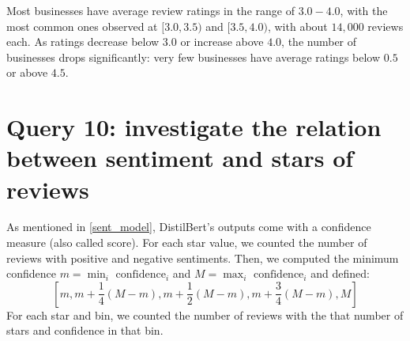 \documentclass{Configuration_Files/PoliMi3i_thesis}
\begin{document}
\bigskip

Most businesses have average review ratings in the range of $3.0 - 4.0$, with the most common ones observed at $[3.0, 3.5)$ and $[3.5, 4.0)$, with about $14,000$ reviews each. As ratings decrease below $3.0$ or increase above $4.0$, the number of businesses drops significantly: very few businesses have average ratings below $0.5$ or above $4.5$.

\section{Query 10: investigate the relation between sentiment and stars of reviews}
As mentioned in \ref{sent_model}, DistilBert's outputs come with a confidence measure (also called score). For each star value, we counted the number of reviews with positive and negative sentiments. Then, we computed the minimum confidence $m=\min_i\,\,\text{confidence}_i$ and $M=\max_i \,\, \text{confidence}_i$ and defined:
$$\left[m, m + \frac14(M-m), m+\frac12(M-m), m+\frac34(M-m), M\right]$$
For each star and bin, we counted the number of reviews with the that number of stars and confidence in that bin.
\end{document}
